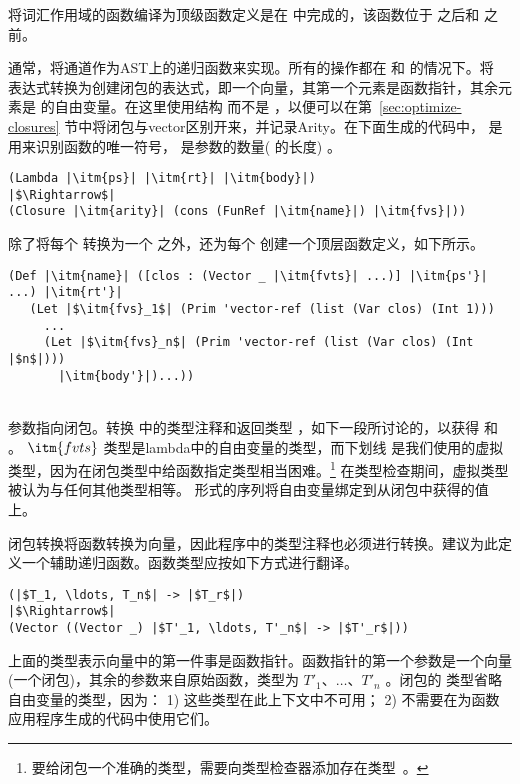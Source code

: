 \documentclass[11pt]{book}
\begin{document}
将词汇作用域的函数编译为顶级函数定义是在 
中完成的，该函数位于  之后和
 之前。

通常，将通道作为AST上的递归函数来实现。所有的操作都在  和
 的情况下。将  表达式转换为创建闭包的表达式，即一个向量，其第一个元素是函数指针，其余元素是  的自由变量。在这里使用结构  而不是  ，以便可以在第~\ref{sec:optimize-closures} 节中将闭包与vector区别开来，并记录Arity。在下面生成的代码中，  是用来识别函数的唯一符号，  是参数的数量(  的长度) 。
\begin{lstlisting}
(Lambda |\itm{ps}| |\itm{rt}| |\itm{body}|)
|$\Rightarrow$|
(Closure |\itm{arity}| (cons (FunRef |\itm{name}|) |\itm{fvs}|))
\end{lstlisting}
除了将每个  转换为一个  之外，还为每个  创建一个顶层函数定义，如下所示。\\
\begin{minipage}{0.8\textwidth}
\begin{lstlisting}
(Def |\itm{name}| ([clos : (Vector _ |\itm{fvts}| ...)] |\itm{ps'}| ...) |\itm{rt'}|
   (Let |$\itm{fvs}_1$| (Prim 'vector-ref (list (Var clos) (Int 1)))
     ...
     (Let |$\itm{fvs}_n$| (Prim 'vector-ref (list (Var clos) (Int |$n$|)))
       |\itm{body'}|)...))
\end{lstlisting}
\end{minipage}\\
  参数指向闭包。转换  中的类型注释和返回类型  ，如下一段所讨论的，以获得  和  。
$\itm{fvts}$ 类型是lambda中的自由变量的类型，而下划线 \code{\_} 是我们使用的虚拟类型，因为在闭包类型中给函数指定类型相当困难。\footnote{要给闭包一个准确的类型，需要向类型检查器添加存在类型~\citep{Minamide:1996ys}。}
在类型检查期间，虚拟类型被认为与任何其他类型相等。  形式的序列将自由变量绑定到从闭包中获得的值上。

闭包转换将函数转换为向量，因此程序中的类型注释也必须进行转换。建议为此定义一个辅助递归函数。函数类型应按如下方式进行翻译。
\begin{lstlisting}
(|$T_1, \ldots, T_n$| -> |$T_r$|)
|$\Rightarrow$|  
(Vector ((Vector _) |$T'_1, \ldots, T'_n$| -> |$T'_r$|))
\end{lstlisting}

上面的类型表示向量中的第一件事是函数指针。函数指针的第一个参数是一个向量(一个闭包)，其余的参数来自原始函数，类型为 $T'_1 、 \ldots 、 T'_n$ 。闭包的  类型省略自由变量的类型，因为： 1) 这些类型在此上下文中不可用； 2) 不需要在为函数应用程序生成的代码中使用它们。
\end{document}
